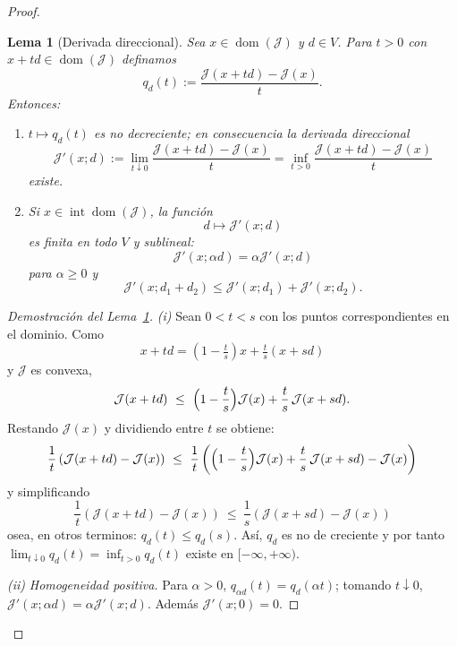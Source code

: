 \documentclass[12pt]{book}
\theoremstyle{definition}
\theoremstyle{plain}
\newtheorem{lema}{Lema}[section]
\theoremstyle{remark}
\begin{document}
\begin{proof}
\begin{lema}[Derivada direccional]
\label{lema:derivada}
Sea $x\in\operatorname{dom}(\mathcal{J})$ y $d\in V$. Para $t>0$ con
$x+td\in\operatorname{dom}(\mathcal{J})$ definamos
\[
q_{d}(t):=\dfrac{\mathcal{J}(x+td)-\mathcal{J}(x)}{t}.\] Entonces:
\begin{enumerate}
  \item[(i)] $t\mapsto q_{d}(t)$ es no decreciente; en consecuencia la
        derivada direccional
        \[
        \mathcal{J}'(x;d)
        :=\lim_{t\downarrow 0}
        \frac{\mathcal{J}(x+td)-\mathcal{J}(x)}{t}
        =\inf_{t>0}\frac{\mathcal{J}(x+td)-\mathcal{J}(x)}{t}
        \]
        existe. %
  \item[(ii)] Si $x\in\operatorname{int}\operatorname{dom}(\mathcal{J})$,
la funci\'on \[d\mapsto \mathcal{J}'(x;d)\] es finita en todo $V$ y
        sublineal:
        \[\mathcal{J}'(x;\alpha d)=\alpha\mathcal{J}'(x;d)\] para
        $\alpha\ge0$ y
        \[\mathcal{J}'(x;d_{1}+d_{2})\le\mathcal{J}'(x;d_{1})
        +\mathcal{J}'(x;d_{2}).\]
\end{enumerate}
\end{lema}

\begin{proof}[Demostraci\'on del Lema~\ref{lema:derivada}]

\medskip

\noindent \emph{(i)} Sean $0<t<s$ con los puntos correspondientes en el dominio.
Como \[
\displaystyle
x+td=\left(1-\tfrac{t}{s}\right)x+\tfrac{t}{s}(x+sd)\] y
$\mathcal{J}$ es convexa,
\[
\mathcal{J}(x+td)\ \le\
\Bigl(1-\frac{t}{s}\Bigr)\mathcal{J}(x)
+\frac{t}{s}\,\mathcal{J}(x+sd).
\]
Restando $\mathcal{J}(x)$ y dividiendo entre $t$ se obtiene:
\[
\frac{1}{t} \left (
\mathcal{J}(x+td) - 
\mathcal{J}(x) \right )
\ \le\
\frac{1}{t}
\left (
\Bigl(1-\frac{t}{s}\Bigr)\mathcal{J}(x)
+\frac{t}{s}\,\mathcal{J}(x+sd)
- \mathcal{J}(x) \right )
\]
y simplificando
\[
\frac{1}{t} \left (
\mathcal{J}(x+td) - 
\mathcal{J}(x) \right )
\ \le\
\frac{1}{s}
\left (
\mathcal{J}(x+sd)
- \mathcal{J}(x) \right )
\] osea, en otros terminos: 
$q_{d}(t)\le q_{d}(s)$. As\'i, $q_{d}$ es no de creciente y por tanto
$\lim_{t\downarrow0}q_{d}(t)=\inf_{t>0}q_{d}(t)$ existe en
$[-\infty,+\infty)$.

\medskip

\noindent
\emph{(ii)} \emph{Homogeneidad positiva.} Para $\alpha>0$,
$q_{\alpha d}(t)=q_{d}(\alpha t)$; tomando $t\downarrow0$,
$\mathcal{J}'(x;\alpha d)=\alpha\mathcal{J}'(x;d)$. Adem\'as
$\mathcal{J}'(x;0)=0$.


\end{proof}
\end{proof}
\end{document}
